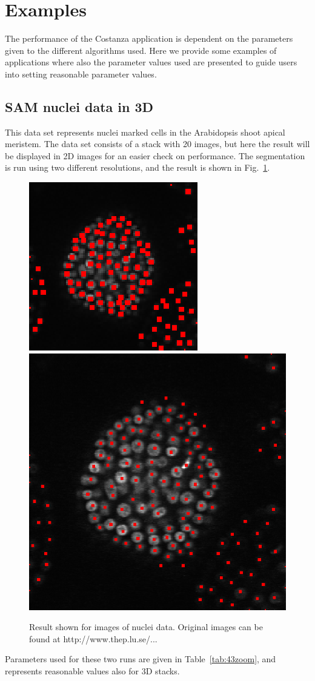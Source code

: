 \documentclass[a4paper,12pt]{article}
\begin{document}
\section{Examples}

The performance of the Costanza application is dependent on the
parameters given to the different algorithms used. Here we provide
some examples of applications where also the parameter values used are
presented to guide users into setting reasonable parameter values.

\subsection{SAM nuclei data in 3D}

This data set represents nuclei marked cells in the Arabidopsis shoot apical
meristem. The data set consists of a stack with 20 images, but here the result
will be displayed in 2D images for an easier check on performance. The
segmentation is run using two different resolutions, and the result is shown
in Fig.~\ref{fig:43zoom}.

\begin{figure}[h!]
\begin{center}
\includegraphics[width=0.25\columnwidth]{figures/43smallzoomCenters.eps}
\hspace{0.20\columnwidth}
\includegraphics[width=0.5\columnwidth]{figures/43zoomCenters.eps}
\caption{Result shown for images of nuclei data. Original images can be found
	at http://www.thep.lu.se/...}
\label{fig:43zoom}
\end{center}
\end{figure}
%
Parameters used for these two runs are given in Table~\ref{tab:43zoom}, and
represents reasonable values also for 3D stacks.
\end{document}
